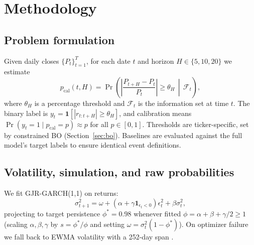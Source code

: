 \documentclass[11pt,a4paper]{article}
\newcommand{\pcal}{p_{\text{cal}}}
\newcommand{\abs}[1]{\left|#1\right|}
\begin{document}
\section{Methodology}
\label{sec:methodology}

\subsection{Problem formulation}

Given daily closes $\{P_t\}_{t=1}^{T}$, for each date $t$ and horizon $H \in \{5, 10, 20\}$ we estimate
\begin{equation}
  \pcal(t, H) = \Pr\!\left(\abs{\frac{P_{t+H} - P_t}{P_t}} \geq \theta_H \,\middle|\, \mathcal{F}_t\right),
  \label{eq:target}
\end{equation}
where $\theta_H$ is a percentage threshold and $\mathcal{F}_t$ is the information set at time $t$. The binary label is $y_t = \mathbf{1}[\abs{r_{t:t+H}} \geq \theta_H]$, and calibration means $\Pr(y_t = 1 \mid \pcal = p) \approx p$ for all $p \in [0,1]$. Thresholds are ticker-specific, set by constrained BO (Section~\ref{sec:bo}). Baselines are evaluated against the full model's target labels to ensure identical event definitions.

\subsection{Volatility, simulation, and raw probabilities}

We fit GJR-GARCH(1,1) on returns:
\begin{equation}
  \sigma_{t+1}^2 = \omega + (\alpha + \gamma \mathbf{1}_{\epsilon_t < 0})\epsilon_t^2 + \beta\sigma_t^2,
\end{equation}
projecting to target persistence $\phi^\ast = 0.98$ whenever fitted $\phi = \alpha + \beta + \gamma/2 \geq 1$ (scaling $\alpha, \beta, \gamma$ by $s = \phi^\ast / \phi$ and setting $\omega = \sigma_t^2(1-\phi^\ast)$). On optimizer failure we fall back to EWMA volatility with a 252-day span \cite{jp1996riskmetrics}.
\end{document}

